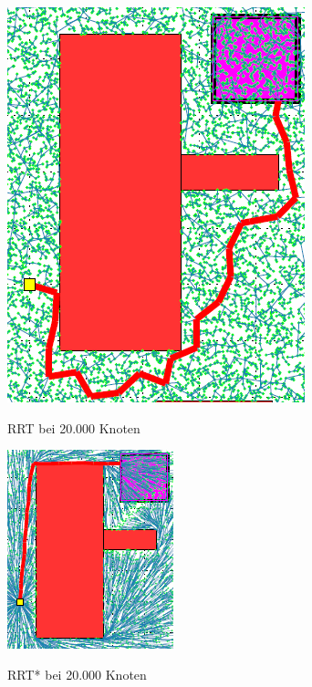 \begin{figure}[htb]
    \centering
    \begin{minipage}[t]{0.45\linewidth}
        \centering
        \includegraphics[width=.6\linewidth]{Bilder/rrt_path.png}
        \caption{RRT bei 20.000 Knoten}
    \end{minipage}%
    \hfill
    \begin{minipage}[t]{0.45\linewidth}
\label{fig:fig7}                 
        \centering
        \includegraphics[width=.6\linewidth]{Bilder/rrt_star_path.png}
        \caption{RRT* bei 20.000 Knoten}
    \end{minipage}
\end{figure}

